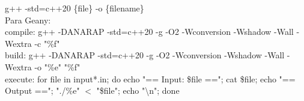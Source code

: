 \begin{code}
g++ -std=c++20 \{file\} -o \{filename\} \\
Para Geany: \\
compile: g++ -DANARAP -std=c++20 -g -O2 -Wconversion -Wshadow -Wall -Wextra -c "\%f" \\
build: g++ -DANARAP -std=c++20 -g -O2 -Wconversion -Wshadow -Wall -Wextra -o "\%e" "\%f" \\
execute: for file in input*.in; do echo "== Input: \$file =="; cat \$file; echo "== Output =="; "./\%e" $<$ "\$file"; echo "\textbackslash n"; done
\end{code}
